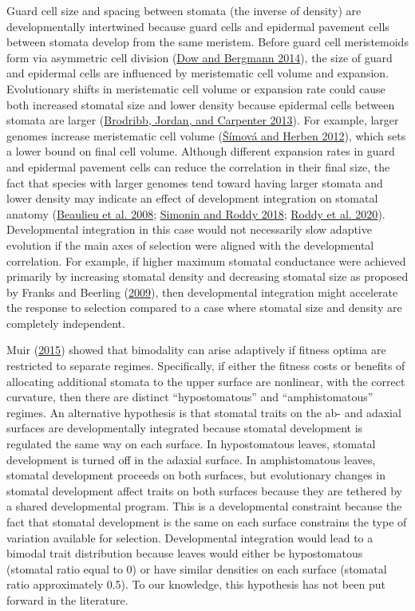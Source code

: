 \documentclass[
  12pt,
]{article}
\begin{document}
Guard cell size and spacing between stomata (the inverse of density) are developmentally intertwined because guard cells and epidermal pavement cells between stomata develop from the same meristem. Before guard cell meristemoids form via asymmetric cell division (\protect\hyperlink{ref-dow_patterning_2014}{Dow and Bergmann 2014}), the size of guard and epidermal cells are influenced by meristematic cell volume and expansion. Evolutionary shifts in meristematic cell volume or expansion rate could cause both increased stomatal size and lower density because epidermal cells between stomata are larger (\protect\hyperlink{ref-brodribb_unified_2013}{Brodribb, Jordan, and Carpenter 2013}). For example, larger genomes increase meristematic cell volume (\protect\hyperlink{ref-simova_geometrical_2012}{Šímová and Herben 2012}), which sets a lower bound on final cell volume. Although different expansion rates in guard and epidermal pavement cells can reduce the correlation in their final size, the fact that species with larger genomes tend toward having larger stomata and lower density may indicate an effect of development integration on stomatal anatomy (\protect\hyperlink{ref-beaulieu_genome_2008}{Beaulieu et al. 2008}; \protect\hyperlink{ref-simonin_genome_2018}{Simonin and Roddy 2018}; \protect\hyperlink{ref-roddy_scaling_2020}{Roddy et al. 2020}). Developmental integration in this case would not necessarily slow adaptive evolution if the main axes of selection were aligned with the developmental correlation. For example, if higher maximum stomatal conductance were achieved primarily by increasing stomatal density and decreasing stomatal size as proposed by Franks and Beerling (\protect\hyperlink{ref-franks_maximum_2009}{2009}), then developmental integration might accelerate the response to selection compared to a case where stomatal size and density are completely independent.

Muir (\protect\hyperlink{ref-muir_making_2015}{2015}) showed that bimodality can arise adaptively if fitness optima are restricted to separate regimes. Specifically, if either the fitness costs or benefits of allocating additional stomata to the upper surface are nonlinear, with the correct curvature, then there are distinct ``hypostomatous'' and ``amphistomatous'' regimes. An alternative hypothesis is that stomatal traits on the ab- and adaxial surfaces are developmentally integrated because stomatal development is regulated the same way on each surface. In hypostomatous leaves, stomatal development is turned off in the adaxial surface. In amphistomatous leaves, stomatal development proceeds on both surfaces, but evolutionary changes in stomatal development affect traits on both surfaces because they are tethered by a shared developmental program. This is a developmental constraint because the fact that stomatal development is the same on each surface constrains the type of variation available for selection. Developmental integration would lead to a bimodal trait distribution because leaves would either be hypostomatous (stomatal ratio equal to 0) or have similar densities on each surface (stomatal ratio approximately 0.5). To our knowledge, this hypothesis has not been put forward in the literature.
\end{document}
